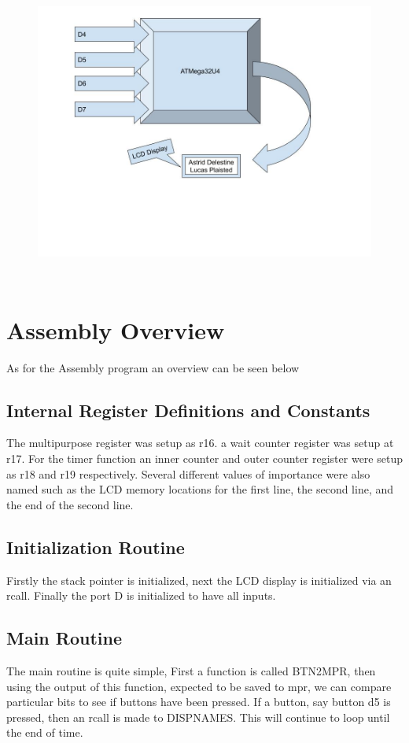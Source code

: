 \documentclass[12pt,letterpaper]{article}
\begin{document}
\begin{figure}[h]
	\includegraphics[width=12cm, height=10cm]{BlockDiagramLab3.jpg}
	\centering
\end{figure}
	
\section{Assembly Overview}
As for the Assembly program an overview can be seen below

\subsection{Internal Register Definitions and Constants}
The multipurpose register was setup as r16. a wait counter register was setup at r17. For the timer function an inner counter and outer counter register were setup as r18 and r19 respectively. Several different values of importance were also named such as the LCD memory locations for the first line, the second line, and the end of the second line. 

\subsection{Initialization Routine}
Firstly the stack pointer is initialized, next the LCD display is initialized via an rcall. Finally the port D is initialized to have all inputs. 

\subsection{Main Routine}
The main routine is quite simple, First a function is called BTN2MPR, then using the output of this function, expected to be saved to mpr, we can compare particular bits to see if buttons have been pressed. If a button, say button d5 is pressed, then an rcall is made to DISPNAMES. This will continue to loop until the end of time. 
\end{document}
